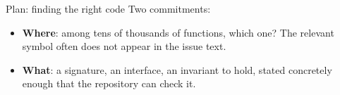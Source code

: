 \documentclass[
  aspectratio=169,
  font=times,
  sectionpage=true,
]{tumbeamer}
\newcommand{\agentloopdiagram}[1][none]{%
  \def\hlintent{stage}\def\hlplan{stage}\def\hlgen{stage}%
  \def\hlexec{stage}\def\hlrefine{stage}%
  \ifstrequal{#1}{intent}{\def\hlintent{here}}{}%
  \ifstrequal{#1}{plan}{\def\hlplan{here}}{}%
  \ifstrequal{#1}{gen}{\def\hlgen{here}}{}%
  \ifstrequal{#1}{exec}{\def\hlexec{here}}{}%
  \ifstrequal{#1}{refine}{\def\hlrefine{here}}{}%
  \begin{tikzpicture}[
    stage/.style={draw=TUMBlue, fill=TUMBlue!8, rounded corners=3pt,
                  font=\small, align=center, minimum height=0.8cm,
                  minimum width=2.2cm},
    here/.style={draw=TUMOrange, fill=TUMOrange!15, rounded corners=3pt,
                 font=\small\bfseries, align=center, minimum height=0.8cm,
                 minimum width=2.2cm},
    note/.style={font=\scriptsize, text=TUMGrayDark, align=center, inner sep=1pt},
    arr/.style={-{Stealth[length=1.8mm]}, very thick, TUMGrayDark},
    feedback/.style={-{Stealth[length=1.8mm]}, very thick, dashed, TUMOrange},
    fblab/.style={font=\tiny, text=TUMOrange, align=center, inner sep=1.5pt,
                  fill=white},
    key/.style={font=\scriptsize, text=TUMGrayDark, anchor=west},
  ]
    \node[\hlintent] (intent) at (0,0)      {Intent\\capture};
    \node[\hlplan]   (plan)   at (3.3,0)    {Planning};
    \node[\hlgen]    (gen)    at (6.6,0)    {Code\\generation};
    \node[\hlexec]   (exec)   at (6.6,-1.9) {Execution};
    \node[\hlrefine] (refine) at (3.3,-1.9) {Refinement};

    \draw[arr] (intent) -- (plan);
    \draw[arr] (plan) -- (gen);
    \draw[arr] (gen) -- (exec);
    \draw[arr] (exec) -- (refine);

    \draw[feedback] (refine.north) -- node[fblab, right] {replan} (plan.south);
    \draw[feedback] (refine.north east) -- node[fblab, pos=0.5] {regenerate}
      (gen.south west);

    \node[note, above=0.15cm of intent] {NL issue or spec};
    \node[note, below=0.15cm of exec] {test failures, traces};

    \node[stage, minimum width=0.55cm, minimum height=0.34cm] at (0.27,-3.72) {};
    \node[key] at (0.78,-3.72)
      {\textbf{Interface}: connect LLM and system};
  \end{tikzpicture}%
}
\begin{document}

\begin{frame}{Plan: finding the right code}
  \label{fr:planning}
  Two commitments: 

  \bigskip
  \begin{itemize}
    \item \textbf{Where}: among tens of thousands of functions, which one?
      The relevant symbol often does not appear in the issue text.
      \medskip
    \item \textbf{What}: a signature, an interface, an invariant to hold, stated
      concretely enough that the repository can check it.
  \end{itemize}

\end{frame}
\end{document}
